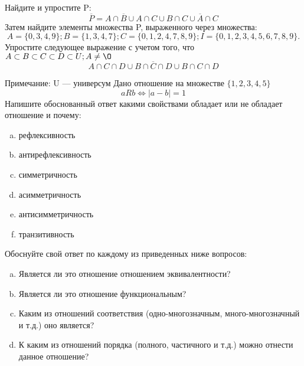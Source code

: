 \documentclass[10pt]{exam}
\begin{document}
\begin{questions}
\question
Найдите и упростите P:
\begin{equation*}
\overline{P} = A \cap \overline{B} \cup A \cap C \cup B \cap C \cup \overline{A} \cap C
\end{equation*}
Затем найдите элементы множества P, выраженного через множества:
\begin{equation*}
A = \{0, 3, 4, 9\}; 
B = \{1, 3, 4, 7\};
C = \{0, 1, 2, 4, 7, 8, 9\};
I = \{0, 1, 2, 3, 4, 5, 6, 7, 8, 9\}.
\end{equation*}\question
Упростите следующее выражение с учетом того, что $A\subset B \subset C \subset D \subset U; A \neq \O$
\begin{equation*}
A \cap C  \cap D \cup B \cap \overline{C} \cap D \cup B \cap C \cap D
\end{equation*}

Примечание: U — универсум\question
Дано отношение на множестве $\{1, 2, 3, 4, 5\}$ 
\begin{equation*}
aRb \iff |a-b| = 1
\end{equation*}
Напишите обоснованный ответ какими свойствами обладает или не обладает отношение и почему:   
\begin{enumerate} [a)]\setcounter{enumi}{0}
\item рефлексивность
\item антирефлексивность
\item симметричность
\item асимметричность
\item антисимметричность
\item транзитивность
\end{enumerate}

Обоснуйте свой ответ по каждому из приведенных ниже вопросов:
\begin{enumerate} [a)]\setcounter{enumi}{0}
    \item Является ли это отношение отношением эквивалентности?
    \item Является ли это отношение функциональным?
    \item Каким из отношений соответствия (одно-многозначным, много-многозначный и т.д.) оно является?
    \item К каким из отношений порядка (полного, частичного и т.д.) можно отнести данное отношение?
\end{enumerate}


\end{questions}
\end{document}
